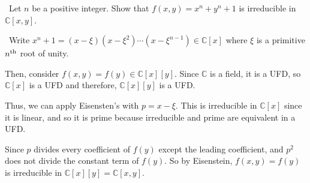 \documentclass[12pt]{AlgebraQual}
\begin{document}
\begin{problem} $\,$
Let $n$ be a positive integer. Show that $f(x,y)=x^n+y^n+1$ is irreducible in $\mathbb{C}[x,y]$.
\end{problem}


\begin{solution}$\,$
Write $x^n+1=(x-\xi)(x-\xi^2)\cdots(x-\xi^{n-1})\in\mathbb{C}[x]$ where $\xi$ is a primitive $n^\text{th}$ root of unity.

Then, consider $f(x,y)=f(y)\in\mathbb{C}[x][y]$. Since $\mathbb{C}$ is a field, it is a UFD, so $\mathbb{C}[x]$ is a UFD and therefore, $\mathbb{C}[x][y]$ is a UFD.

Thus, we can apply Eisensten's with $p=x-\xi$. This is irreducible in $\mathbb{C}[x]$ since it is linear, and so it is prime because irreducible and prime are equivalent in a UFD.

Since $p$ divides every coefficient of $f(y)$ except the leading coefficient, and $p^2$ does not divide the constant term of $f(y)$. So by Eisenstein, $f(x,y)=f(y)$ is irreducible in $\mathbb{C}[x][y]=\mathbb{C}[x,y].$
\end{solution}
\end{document}
